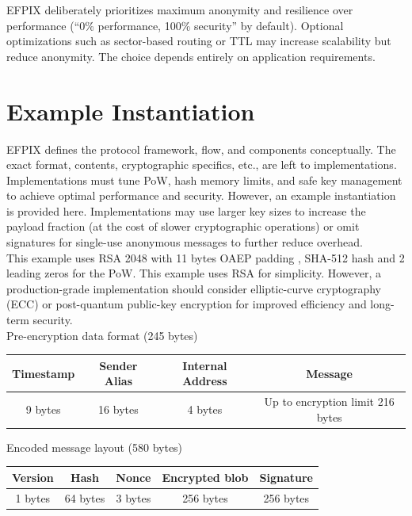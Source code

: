 \documentclass{article}
\begin{document}
EFPIX deliberately prioritizes maximum anonymity and resilience over performance (“0\% performance, 100\% security” by default). Optional optimizations such as sector-based routing or TTL may increase scalability but reduce anonymity. The choice depends entirely on application requirements.

\section{Example Instantiation}
EFPIX defines the protocol framework, flow, and components conceptually. The exact format, contents, cryptographic specifics, etc., are left to implementations. Implementations must tune PoW, hash memory limits, and safe key management to achieve optimal performance and security.
However, an example instantiation is provided here. Implementations may use larger key sizes to increase the payload fraction (at the cost of slower cryptographic operations) or omit signatures for single-use anonymous messages to further reduce overhead.\\

This example uses RSA 2048 \cite{rsa1978} with 11 bytes OAEP padding \cite{oaep1995}, SHA-512 hash \cite{sha512} and 2 leading zeros for the PoW. This example uses RSA for simplicity. However, a production-grade implementation should consider elliptic-curve cryptography (ECC) or post-quantum public-key encryption for improved efficiency and long-term security. \\

Pre-encryption data format (245 bytes)
\begin{table}[h]
\centering
\begin{tabular}{|c|c|c|c|}
\hline
\textbf{Timestamp} & \textbf{Sender Alias} & \textbf{Internal Address} & \textbf{Message} \\
\hline
9 bytes & 16 bytes & 4 bytes & Up to encryption limit 216 bytes \\
\hline
\end{tabular}
\end{table}

Encoded message layout (580 bytes)
\begin{table}[h]
\centering
\begin{tabular}{|c|c|c|c|c|}
\hline
\textbf{Version} & \textbf{Hash} & \textbf{Nonce} & \textbf{Encrypted blob} & \textbf{Signature} \\
\hline
1 bytes & 64 bytes & 3 bytes & 256 bytes & 256 bytes \\
\hline
\end{tabular}
\end{table}
\end{document}
